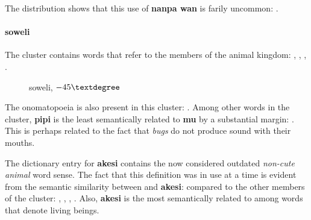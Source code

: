 \documentclass[14pt, a4paper]{extreport}
\makeatletter
\DeclareRobustCommand\ttfamily
        {\not@math@alphabet\ttfamily\mathtt
         \fontfamily\ttdefault\small\selectfont}
\makeatother
\begin{document}
The distribution shows that this use of \textbf{nanpa wan} is farily uncommon: .
        \paragraph{soweli}
The cluster  contains words that refer to the members of the animal kingdom: , , , .

\begin{figure}[ht]%
  \def\angle{-45}
  \bigskip
  \centering
  \caption{soweli, \(\angle\textdegree\)}
\end{figure}%

The onomatopoeia  is also present in this cluster: . Among other words in the cluster, \textbf{pipi} is the least semantically related to \textbf{mu} by a substantial margin: . This is perhaps related to the fact that \textit{bugs} do not produce sound with their mouths.

The dictionary entry for \textbf{akesi} contains the now considered outdated \textit{non-cute animal} word sense. The fact that this definition was in use at a time is evident from the semantic similarity between  and \textbf{akesi}:  compared to the other members of the cluster: , , , . Also, \textbf{akesi} is the most semantically related to  among words that denote living beings.
\end{document}
